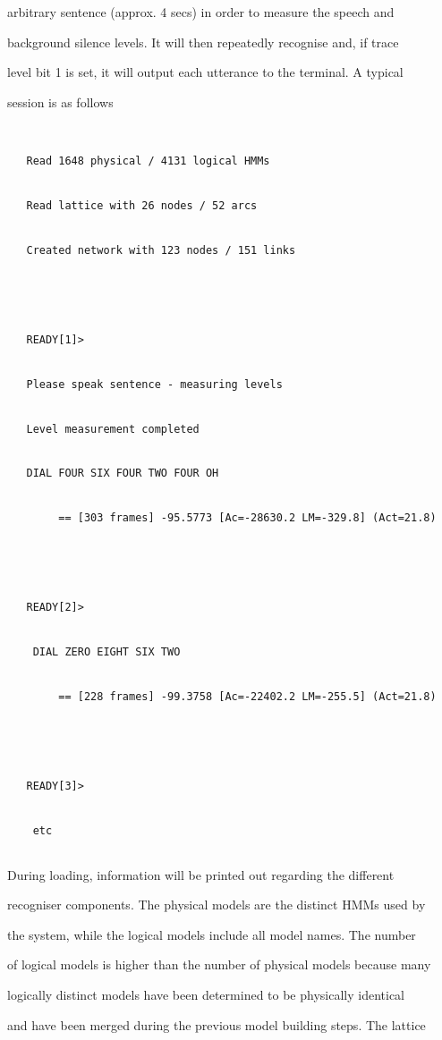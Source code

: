 arbitrary sentence (approx. 4 secs) in order to measure the speech and


background silence levels. It will then repeatedly recognise and, if trace


level bit 1 is set, it will output each utterance to the terminal. A typical


session is as follows





\begin{verbatim}


   Read 1648 physical / 4131 logical HMMs


   Read lattice with 26 nodes / 52 arcs


   Created network with 123 nodes / 151 links





   READY[1]>


   Please speak sentence - measuring levels


   Level measurement completed


   DIAL FOUR SIX FOUR TWO FOUR OH  


        == [303 frames] -95.5773 [Ac=-28630.2 LM=-329.8] (Act=21.8)


   


   READY[2]>


    DIAL ZERO EIGHT SIX TWO 


        == [228 frames] -99.3758 [Ac=-22402.2 LM=-255.5] (Act=21.8)


   


   READY[3]>


    etc


\end{verbatim}


During loading, information will be printed out regarding the different


recogniser components. The physical models are the distinct HMMs used by 


the system, while the logical models include all model names. The number 


of logical models is higher than the number of physical models because many 


logically distinct models have been determined to be physically identical 


and have been merged during the previous model building steps. The lattice


